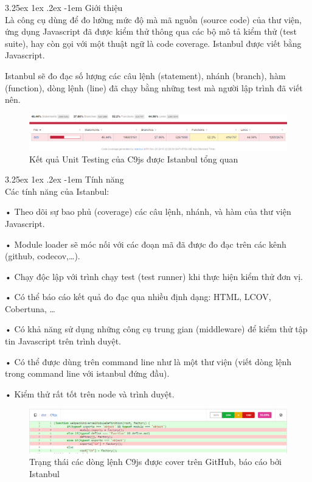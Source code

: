 \documentclass[12pt,a4paper]{article}
\makeatletter
\let\newcounter\@gobble\let\setcounter\@gobbletwo
\newcommand{\myparagraph}[1]{\paragraph{#1}\mbox{}\\} %
\newcounter{subsubsubsection}[subsubsection]
\renewcommand\paragraph{\@startsection{paragraph}{5}{\z@}%
  {3.25ex \@plus1ex \@minus.2ex}%
  {-1em}%
  {\normalfont\normalsize\bfseries}}
\makeatother
\begin{document}
\label{sec:istanbul}
\myparagraph{Giới thiệu}
Là công cụ dùng để đo lường mức độ mà mã nguồn (source code) của thư viện, ứng dụng Javascript đã được kiểm thử thông qua các bộ mô tả kiểm thử (test suite), hay còn gọi với một thuật ngữ là code coverage. Istanbul được viết bằng Javascript.

Istanbul sẽ đo đạc số lượng các câu lệnh (statement), nhánh (branch), hàm (function), dòng lệnh (line) đã chạy bằng những test mà người lập trình đã viết nên.

\begin{figure}[htp]
	\begin{center}
    \includegraphics[scale=.5]{image/istanbul_1}
    \caption{Kết quả Unit Testing của C9js được Istanbul tổng quan}
    \label{fig:istanbul_1}
	\end{center}
\end{figure}

\myparagraph{Tính năng}
Các tính năng của Istanbul:

\begin{list}{}{}
\item[•] Theo dõi sự bao phủ (coverage) các câu lệnh, nhánh, và hàm của thư viện Javascript.
\item[•] Module loader sẽ móc nối với các đoạn mã đã được đo đạc trên các kênh (github, codecov,…).
\item[•] Chạy độc lập với trình chạy test (test runner) khi thực hiện kiểm thử đơn vị.
\item[•] Có thể báo cáo kết quả đo đạc qua nhiều định dạng: HTML, LCOV, Cobertuna, …
\item[•] Có khả năng sử dụng những công cụ trung gian (middleware) để kiểm thử tập tin Javascript trên trình duyệt.
\item[•] Có thể được dùng trên command line như là một thư viện (viết dòng lệnh trong command line với istanbul đứng đầu).
\item[•] Kiểm thử rất tốt trên node và trình duyệt.
\end{list}

\begin{figure}[htp]
	\begin{center}
    \includegraphics[scale=.5]{image/istanbul_2}
    \caption{Trạng thái các dòng lệnh C9js được cover trên GitHub, báo cáo bởi Istanbul}
    \label{fig:istanbul_2}
	\end{center}
\end{figure}
\end{document}
